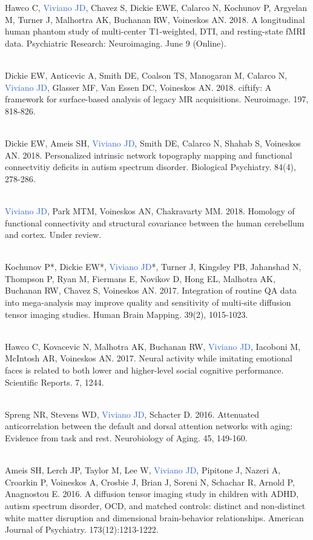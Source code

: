 \documentclass[a4paper,11pt,oneside]{book}
\begin{document}
\begin{flushleft}
Hawco C, \textcolor{highlight}{Viviano JD}, Chavez S, Dickie EWE, Calarco N, Kochunov P, Argyelan M, Turner J, Malhortra AK, Buchanan RW, Voineskos AN. 2018. A longitudinal human phantom study of multi-center T1-weighted, DTI, and resting-state fMRI data. Psychiatric Research: Neuroimaging. June 9 (Online).  \\\

Dickie EW, Anticevic A, Smith DE, Coalson TS, Manogaran M, Calarco N, \textcolor{highlight}{Viviano JD}, Glasser MF, Van Essen DC, Voineskos AN. 2018. ciftify: A framework for surface-based analysis of legacy MR acquisitions. Neuroimage. 197, 818-826. \\\

Dickie EW, Ameis SH, \textcolor{highlight}{Viviano JD}, Smith DE, Calarco N, Shahab S, Voineskos AN. 2018. Personalized intrinsic network topography mapping and functional connectvitiy deficits in autism spectrum disorder. Biological Psychiatry. 84(4), 278-286. \\\

\textcolor{highlight}{Viviano JD}, Park MTM, Voineskos AN, Chakravarty MM. 2018. Homology of functional connectivity and structural covariance between the human cerebellum and cortex. Under review. \\\

Kochunov P*, Dickie EW*, \textcolor{highlight}{Viviano JD}*, Turner J, Kingsley PB, Jahanshad N, Thompson P, Ryan M, Fiermans E, Novikov D, Hong EL, Malhotra AK, Buchanan RW, Chavez S, Voineskos AN. 2017. Integration of routine QA data into mega-analysis may improve quality and sensitivity of multi-site diffusion tensor imaging studies. Human Brain Mapping. 39(2), 1015-1023. \\\

Hawco C, Kovacevic N, Malhotra AK, Buchanan RW, \textcolor{highlight}{Viviano JD}, Iacoboni M, McIntosh AR, Voineskos AN. 2017. Neural activity while imitating emotional faces is related to both lower and higher-level social cognitive performance. Scientific Reports. 7, 1244. \\\

Spreng NR, Stevens WD, \textcolor{highlight}{Viviano JD}, Schacter D. 2016. Attenuated anticorrelation between the default and dorsal attention networks with aging: Evidence from task and rest. Neurobiology of Aging. 45, 149-160. \\\

Ameis SH, Lerch JP, Taylor M, Lee W, \textcolor{highlight}{Viviano JD}, Pipitone J, Nazeri A, Croarkin P, Voineskos A, Crosbie J, Brian J, Soreni N, Schachar R, Arnold P, Anagnostou E. 2016. A diffusion tensor imaging study in children with ADHD, autism spectrum disorder, OCD, and matched controls: distinct and non-distinct white matter disruption and dimensional brain-behavior relationships. American Journal of Psychiatry. 173(12):1213-1222. \\\


\end{flushleft}
\end{document}
